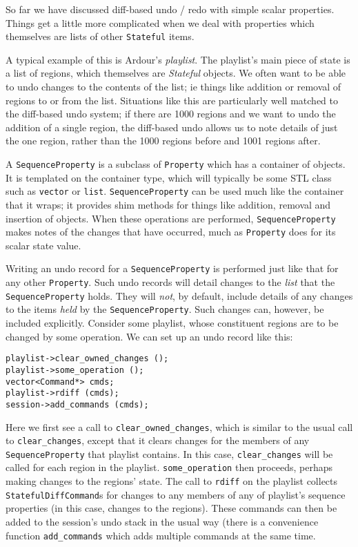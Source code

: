 \documentclass[10pt,a4paper]{book}
\newcommand{\code}[1]{\texttt{#1}}
\begin{document}
So far we have discussed diff-based undo / redo with simple scalar
properties.  Things get a little more complicated when we deal with
properties which themselves are lists of other \code{Stateful} items.

A typical example of this is Ardour's \emph{playlist}.  The playlist's
main piece of state is a list of regions, which themselves are
\emph{Stateful} objects.  We often want to be able to undo changes to
the contents of the list; ie things like addition or removal of
regions to or from the list.  Situations like this are particularly
well matched to the diff-based undo system; if there are 1000 regions
and we want to undo the addition of a single region, the diff-based
undo allows us to note details of just the one region, rather than the
1000 regions before and 1001 regions after.

A \code{SequenceProperty} is a subclass of \code{Property} which has a
container of objects.  It is templated on the container type, which
will typically be some STL class such as \code{vector} or \code{list}.
\code{SequenceProperty} can be used much like the container that it
wraps; it provides shim methods for things like addition, removal and
insertion of objects.  When these operations are performed,
\code{SequenceProperty} makes notes of the changes that have occurred,
much as \code{Property} does for its scalar state value.

Writing an undo record for a \code{SequenceProperty} is performed just
like that for any other \code{Property}.  Such undo records will
detail changes to the \emph{list} that the \code{SequenceProperty}
holds.  They will \emph{not}, by default, include details of any
changes to the items \emph{held} by the \code{SequenceProperty}.  Such
changes can, however, be included explicitly.  Consider some playlist,
whose constituent regions are to be changed by some operation.  We can
set up an undo record like this:

\begin{lstlisting}
playlist->clear_owned_changes ();
playlist->some_operation ();
vector<Command*> cmds;
playlist->rdiff (cmds);
session->add_commands (cmds);
\end{lstlisting}

Here we first see a call to \code{clear\_owned\_changes}, which is
similar to the usual call to \code{clear\_changes}, except that it
clears changes for the members of any \code{SequenceProperty} that
playlist contains.  In this case, \code{clear\_changes} will be called
for each region in the playlist.  \code{some\_operation} then
proceeds, perhaps making changes to the regions' state.  The call to
\code{rdiff} on the playlist collects \code{StatefulDiffCommand}s for
changes to any members of any of playlist's sequence properties (in
this case, changes to the regions).  These commands can then be added
to the session's undo stack in the usual way (there is a convenience
function \code{add\_commands} which adds multiple commands at the
same time.
\end{document}
